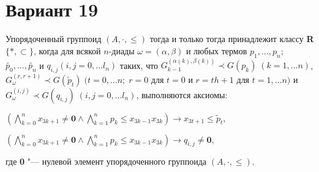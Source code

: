 \documentclass{article}
\begin{document}
\section*{Вариант 19}
Упорядоченный группоид $(A,\cdot, \leqslant)$ тогда и только тогда принадлежит классу \textbf{R}$\{*, \subset\}$, когда для всякой $n$-диады $\omega = (\alpha, \beta)$ и любых термов $p_1,\dots,p_n$;\;$\tilde{p_0},\dots,\tilde{p_n}$ и $q_{i,j}$\;$(i,j = 0,\dots l_n)$ таких, что $G_{k-1}^{(\alpha(k), \beta(k))} \prec G(p_k)\;(k=1,\dots n)$, $G_\omega^{(r,r+1)} \prec G(\tilde{p}_t)\;(t = 0,\dots n;\;r = 0$ для $t = 0$ и $r = th + 1$ для $t = 1,\dots n)$ и $G_\omega^{(i,j)} \prec G(q_{i,j})\;(i,j = 0,\dots l_n)$, выполняются аксиомы:
\begin{center}
$\left(\displaystyle\bigwedge\limits^n_{k=0}x_{3k+1} \neq \textbf{0} \wedge \bigwedge\limits^n_{k=1} p_k \leqslant x_{3k-1}x_{3k}\right) \to x_{3t+1} \leqslant \tilde{p}_t,$

$\left(\displaystyle\bigwedge\limits^n_{k=0}x_{3k+1} \neq \textbf{0} \wedge \bigwedge\limits^n_{k=1} p_k \leqslant x_{3k-1}x_{3k}\right) \to q_{i,j} \neq \textbf{0},$
\end{center}
где \textbf{0} "--- нулевой элемент упорядоченного группоида $(A,\cdot,\leqslant)$.
\end{document}
